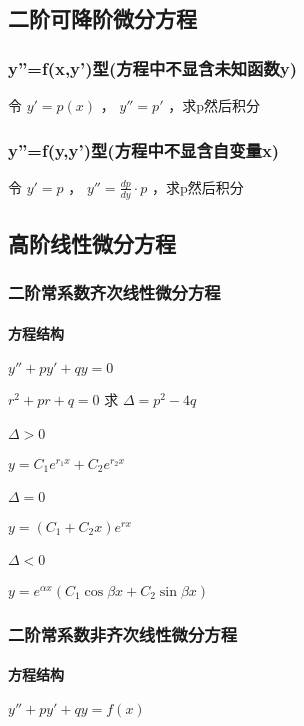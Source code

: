 ﻿\documentclass[a4paper,12pt,UTF8]{ctexart}
\begin{document}
    \subsection{二阶可降阶微分方程}
    
    \subsubsection{y''=f(x,y')型(方程中不显含未知函数y)}
    令 \(y'=p(x)\) ， \(y''=p'\) ，求p然后积分 
    
    \subsubsection{y''=f(y,y')型(方程中不显含自变量x)}
    令 \(y'=p\) ， \(y''=\frac{dp}{dy} \cdot p\) ，求p然后积分  
    
    \subsection{高阶线性微分方程}
    
    \subsubsection{二阶常系数齐次线性微分方程}
    \paragraph{方程结构} \(y''+py'+qy=0\)

    \(r^2+pr+q=0\) 求 \(\Delta=p^2-4q\)
    \paragraph{\(\Delta>0\)} \(y=C_1e^{r_1x}+C_2e^{r_2x}\)
    \paragraph{\(\Delta=0\)} \(y=(C_1+C_2x)e^{rx}\)
    \paragraph{\(\Delta<0\)} \(y=e^{\alpha x}(C_1\cos\beta x+C_2\sin\beta x)\)
    
    \subsubsection{二阶常系数非齐次线性微分方程}
    \paragraph{方程结构} \(y''+py'+qy=f(x)\)
\end{document}
